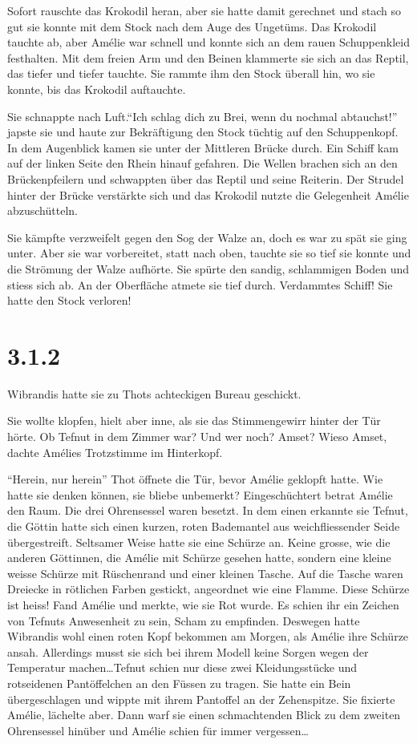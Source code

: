 \documentclass[11pt,titlepage,a5paper]{book}
\begin{document}
Sofort rauschte das Krokodil heran, aber sie hatte damit gerechnet und stach so gut sie konnte mit dem Stock nach dem Auge des Ungetüms. Das Krokodil tauchte ab, aber Amélie war schnell und konnte sich an dem rauen Schuppenkleid festhalten. Mit dem freien Arm und den Beinen klammerte sie sich an das Reptil, das tiefer und tiefer tauchte. Sie rammte ihm den Stock überall hin, wo sie konnte, bis das Krokodil auftauchte. 

Sie schnappte nach Luft."`Ich schlag dich zu Brei, wenn du nochmal abtauchst!"' japste sie und haute zur Bekräftigung den Stock tüchtig auf den Schuppenkopf. In dem Augenblick kamen sie unter der Mittleren Brücke durch. Ein Schiff kam auf der linken Seite den Rhein hinauf gefahren. Die Wellen brachen sich an den Brückenpfeilern und schwappten über das Reptil und seine Reiterin. Der Strudel hinter der Brücke verstärkte sich und das Krokodil nutzte die Gelegenheit Amélie abzuschütteln. 

Sie kämpfte verzweifelt gegen den Sog der Walze an, doch es war zu spät sie ging unter. Aber sie war vorbereitet, statt nach oben, tauchte sie so tief sie konnte und die Strömung der Walze aufhörte. Sie spürte den sandig, schlammigen Boden und stiess sich ab. An der Oberfläche atmete sie tief durch. Verdammtes Schiff! Sie hatte den Stock verloren! 

\section*{3.1.2}

Wibrandis hatte sie zu Thots achteckigen Bureau geschickt.

Sie wollte klopfen, hielt aber inne, als sie das Stimmengewirr hinter der Tür hörte. Ob Tefnut in dem Zimmer war? Und wer noch? Amset? Wieso Amset, dachte Amélies Trotzstimme im Hinterkopf.

"`Herein, nur herein"' Thot öffnete die Tür, bevor Amélie geklopft hatte. Wie hatte sie denken können, sie bliebe unbemerkt? Eingeschüchtert betrat Amélie den Raum. Die drei Ohrensessel waren besetzt. In dem einen erkannte sie Tefnut, die Göttin hatte sich einen kurzen, roten Bademantel aus weichfliessender Seide übergestreift. Seltsamer Weise hatte sie eine Schürze an. Keine grosse, wie die anderen Göttinnen, die Amélie mit Schürze gesehen hatte, sondern eine kleine weisse Schürze mit Rüschenrand und einer kleinen Tasche. Auf die Tasche waren Dreiecke in rötlichen Farben gestickt, angeordnet wie eine Flamme. Diese Schürze ist heiss! Fand Amélie und merkte, wie sie Rot wurde. Es schien ihr ein Zeichen von Tefnuts Anwesenheit zu sein, Scham zu empfinden. Deswegen hatte Wibrandis wohl einen roten Kopf bekommen am Morgen, als Amélie ihre Schürze ansah. Allerdings musst sie sich bei ihrem Modell keine Sorgen wegen der Temperatur machen\dots Tefnut schien nur diese zwei Kleidungsstücke und rotseidenen Pantöffelchen an den Füssen zu tragen.  Sie hatte ein Bein übergeschlagen und wippte mit ihrem Pantoffel an der Zehenspitze. Sie fixierte Amélie, lächelte aber. Dann warf sie einen schmachtenden Blick zu dem zweiten Ohrensessel hinüber und Amélie schien für immer vergessen\dots
\end{document}
